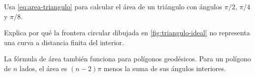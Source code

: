 \begin{exercise}
Usa \cref{eq:area-triangulo} para calcular el área de un triángulo con ángulos \(\pi/2\), \(\pi/4\) y \(\pi/8\).
\end{exercise}

\begin{exercise}
Explica por qué la frontera circular dibujada en \cref{fig:triangulo-ideal} no representa una curva a distancia finita del interior.
\end{exercise}

\begin{remark}
La fórmula de área también funciona para polígonos geodésicos. Para un polígono de \(n\) lados, el área es \((n-2)\pi\) menos la suma de sus ángulos interiores.
\end{remark}
